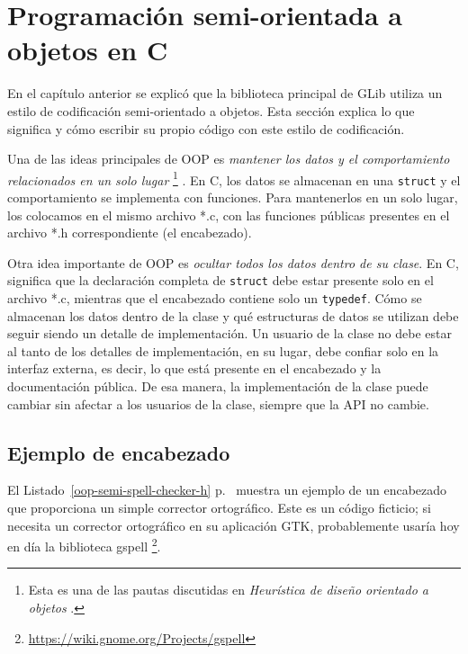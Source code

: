 \chapter{Programación semi-orientada a objetos en C}
\label{oop-semi}

En el capítulo anterior se explicó que la biblioteca principal de GLib utiliza un estilo de codificación semi-orientado a objetos. Esta sección explica lo que significa y cómo escribir su propio código con este estilo de codificación.

Una de las ideas principales de OOP es \emph{mantener los datos y el comportamiento relacionados en un solo lugar} \footnote{Esta es una de las pautas discutidas en \emph{Heurística de diseño orientado a objetos} \cite{oop-book}.} . En C, los datos se almacenan en una \lstinline{struct} y el comportamiento se implementa con funciones. Para mantenerlos en un solo lugar, los colocamos en el mismo archivo *.c, con las funciones públicas presentes en el archivo *.h correspondiente (el encabezado).

Otra idea importante de OOP es \emph{ocultar todos los datos dentro de su clase}. En C, significa que la declaración completa de \lstinline{struct} debe estar presente solo en el archivo *.c, mientras que el encabezado contiene solo un \lstinline{typedef}. Cómo se almacenan los datos dentro de la clase y qué estructuras de datos se utilizan debe seguir siendo un detalle de implementación. Un usuario de la clase no debe estar al tanto de los detalles de implementación, en su lugar, debe confiar solo en la interfaz externa, es decir, lo que está presente en el encabezado y la documentación pública. De esa manera, la implementación de la clase puede cambiar sin afectar a los usuarios de la clase, siempre que la API no cambie.

\section{Ejemplo de encabezado}

El Listado~\ref{oop-semi-spell-checker-h} p.~\pageref{oop-semi-spell-checker-h} muestra un ejemplo de un encabezado que proporciona un simple corrector ortográfico. Este es un código ficticio; si necesita un corrector ortográfico en su aplicación GTK, probablemente usaría hoy en día la biblioteca gspell \footnote{\url{https://wiki.gnome.org/Projects/gspell}}.



